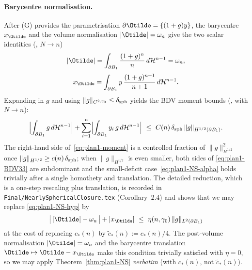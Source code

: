 \paragraph{Barycentre normalisation.}
After (G) provides the parametrisation $\partial\Otilde=\{(1+g)y\}$, the
barycentre $x_{\Otilde}$ and the volume normalisation $|\Otilde|=\omega_{n}$
give the two scalar identities (\cite[(3.6)--(3.7)]{BDV}, $N\to n$)
\begin{equation}\label{eq:plan1-vol-eq}
   |\Otilde|=\int_{\partial B_{1}}\frac{(1+g)^{n}}{n}\,d\mathcal{H}^{n-1}=\omega_{n},
\end{equation}
\begin{equation}\label{eq:plan1-bary-eq}
   x_{\Otilde}=\int_{\partial B_{1}}y\,\frac{(1+g)^{n+1}}{n+1}\,d\mathcal{H}^{n-1}.
\end{equation}
Expanding in $g$ and using $\|g\|_{C^{2,\gamma_{0}}}\le\delta_{\rm sph}$
yields the BDV moment bounds
(\cite[(3.6)--(3.7)]{BDV}, with $N\to n$):
\begin{equation}\label{eq:plan1-moment}
   \Bigl|\int_{\partial B_{1}}g\,d\mathcal{H}^{n-1}\Bigr|
   + \sum_{i=1}^{n}\Bigl|\int_{\partial B_{1}}y_{i}\,g\,d\mathcal{H}^{n-1}\Bigr|
   \ \le\ C(n)\,\delta_{\rm sph}\,\|g\|_{H^{1/2}(\partial B_{1})}.
\end{equation}
The right-hand side of~\eqref{eq:plan1-moment} is a controlled fraction
of $\|g\|_{H^{1/2}}^{2}$ once $\|g\|_{H^{1/2}}\ge c(n)\,\delta_{\rm sph}$;
when $\|g\|_{H^{1/2}}$ is even smaller, both sides of
\eqref{eq:plan1-BDV33} are subdominant and the small-deficit
case~\eqref{eq:plan1-NS-alpha} holds trivially after a single homothety
and translation. The detailed reduction, which is a one-step rescaling
plus translation, is recorded in
\texttt{Final/NearlySphericalClosure.tex} (Corollary~2.4) and shows
that we may replace \eqref{eq:plan1-NS-hyp} by
\begin{equation}\label{eq:plan1-NS-hyp-relaxed}
   \bigl|\,|\Otilde|-\omega_{n}\,\bigr|+|x_{\Otilde}|\ \le\
   \eta(n,\gamma_{0})\,\|g\|_{L^{2}(\partial B_{1})}
\end{equation}
at the cost of replacing $c_{*}(n)$ by
$\widetilde{c}_{*}(n):=c_{*}(n)/4$. The post-volume normalisation
$|\Otilde|=\omega_{n}$ and the barycentre translation
$\Otilde\mapsto\Otilde-x_{\Otilde}$ make this condition trivially
satisfied with $\eta=0$, so we may apply Theorem~\ref{thm:plan1-NS}
\emph{verbatim} (with $c_{*}(n)$, not $\widetilde{c}_{*}(n)$).

